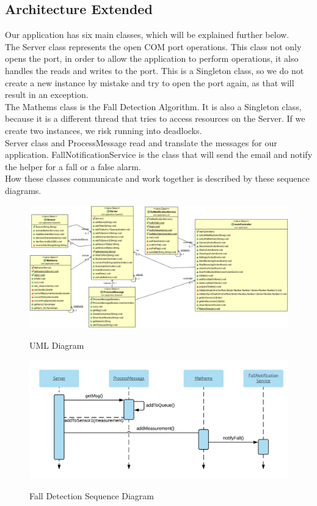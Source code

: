 \documentclass[hidelinks,conference,12pt]{IEEETran}
\begin{document}
\subsection{Architecture Extended}
Our application has six main classes, which will be explained further below.\\
The Server class represents the open COM port operations. This class not only opens the port, in order to allow the application to perform operations, it also handles the reads and writes to the port. This is a Singleton class, so we do not create a new instance by mistake and try to open the port again, as that will result in an exception.\\
The Mathems class is the Fall Detection Algorithm. It is also a Singleton class, because it is a different thread that tries to access resources on the Server. If we create two instances, we risk running into deadlocks.\\
Server class and ProcessMessage read and translate the messages for our application. FallNotificationService is the class that will send the email and notify the helper for a fall or a false alarm.\\
How these classes communicate and work together is described by these sequence diagrams.

\clearpage
\FloatBarrier
\begin{figure}[!h]
	\centering
	\caption{UML Diagram}
	\includegraphics[scale=0.4]{images/UML_Diag.png}
	\label{img:UML_Diag}
\end{figure}
\FloatBarrier

\FloatBarrier
\begin{figure}[!h]
	\centering
	\caption{Fall Detection Sequence Diagram}
	\includegraphics[scale=0.55]{images/Seq_Fall.png}
	\label{img:fall}
\end{figure}
\FloatBarrier
\end{document}
